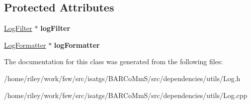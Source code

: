 \subsection*{Protected Attributes}
\begin{DoxyCompactItemize}
\item 
\hyperlink{classisat__utils_1_1_log_filter}{Log\+Filter} $\ast$ {\bfseries log\+Filter}\hypertarget{classisat__utils_1_1_log_acefd881551b3e427865154dbd280cded}{}\label{classisat__utils_1_1_log_acefd881551b3e427865154dbd280cded}

\item 
\hyperlink{classisat__utils_1_1_log_formatter}{Log\+Formatter} $\ast$ {\bfseries log\+Formatter}\hypertarget{classisat__utils_1_1_log_aa2faa91a1c9e3e86f96a912a2df7918c}{}\label{classisat__utils_1_1_log_aa2faa91a1c9e3e86f96a912a2df7918c}

\end{DoxyCompactItemize}


The documentation for this class was generated from the following files\+:\begin{DoxyCompactItemize}
\item 
/home/riley/work/fsw/src/isatgs/\+B\+A\+R\+Co\+Mm\+S/src/dependencies/utils/Log.\+h\item 
/home/riley/work/fsw/src/isatgs/\+B\+A\+R\+Co\+Mm\+S/src/dependencies/utils/Log.\+cpp\end{DoxyCompactItemize}
